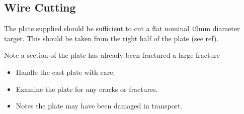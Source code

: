 \subsection{Wire Cutting}
The plate supplied should be sufficient to cut a flat nominal 49mm diameter target. This should be taken from the right half of the plate (see ref\label{fig:Cast Plate}).

Note a section of the plate has already been fractured a large fracture 
\begin{itemize}
\item Handle the cast plate with care. 
\item Examine the plate for any cracks or fractures. 
\item Notes the plate may have been damaged in transport. 
\end{itemize}